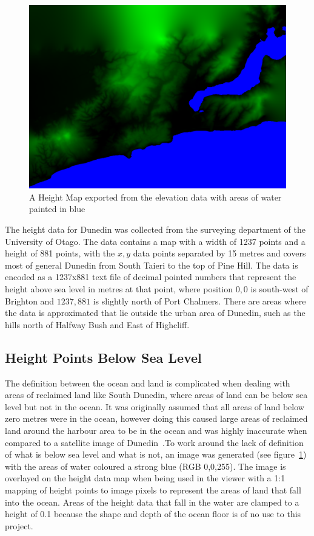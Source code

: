 \documentclass[12pt]{report}
\begin{document}
\begin{figure}[h]
\includegraphics[width=\textwidth]{heightmapandwater.png}
\caption{A Height Map exported from the elevation data with areas of water painted in blue}
\label{image:elevation-water}
\end{figure}
The height data for Dunedin was collected from the surveying department of the University of Otago. The data contains a map with a width of 1237 points and a height of 881 points, with the $x,y$ data points separated by 15 metres and covers most of general Dunedin from South Taieri to the top of Pine Hill. The data is encoded as a 1237x881 text file of decimal pointed numbers that represent the height above sea level in metres at that point, where position $0,0$ is south-west of Brighton and $1237,881$ is slightly north of Port Chalmers. There are areas where the data is approximated that lie outside the urban area of Dunedin, such as the hills north of Halfway Bush and East of Highcliff.

\subsection{Height Points Below Sea Level}
The definition between the ocean and land is complicated when dealing with areas of reclaimed land like South Dunedin, where areas of land can be below sea level but not in the ocean. It was originally assumed that all areas of land below zero metres were in the ocean, however doing this caused large areas of reclaimed land around the harbour area to be in the ocean and was highly inaccurate when compared to a satellite image of Dunedin~\cite{gmaps}.To work around the lack of definition of what is below sea level and what is not, an image was generated (see figure~\ref{image:elevation-water}) with the areas of water coloured a strong blue (RGB 0,0,255). The image is overlayed on the height data map when being used in the viewer with a 1:1 mapping of height points to image pixels to represent the areas of land that fall into the ocean. Areas of the height data that fall in the water are clamped to a height of 0.1 because the shape and depth of the ocean floor is of no use to this project.
\end{document}
